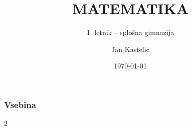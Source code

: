 \documentclass[12pt, aspectratio=169, t]{beamer}
\title{MATEMATIKA}
\subtitle{1. letnik -- splošna gimnazija}
\date{\today}
\author{Jan Kastelic}
\institute[GAA]{Gimnazija Antona Aškerca, \\ Šolski center Ljubljana}
\begin{document}
\begin{frame}
	\titlepage
\end{frame}
	

\begin{frame}
	\frametitle{Vsebina}
	\begin{multicols}{2}
		\tableofcontents[hideallsubsections]
	\end{multicols}

\end{frame}
	



















\end{document}
